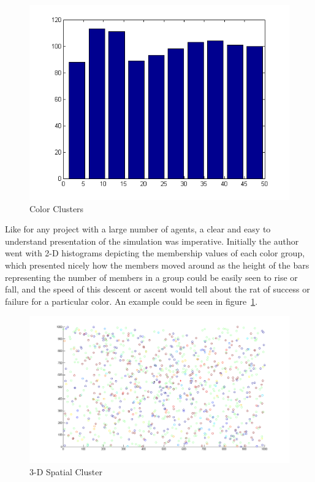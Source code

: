 \begin{figure}
\includegraphics[scale=1]{Figures/1000_agents_color_cluster}
\caption{Color Clusters}
\label{fig:color_clusters}
\end{figure}


Like for any project with a large number of agents, a clear and easy to understand presentation of the simulation was imperative.
Initially the author went with 2-D histograms depicting the membership values of each color group, which presented nicely how the members moved around as the height of the  bars representing the number of members in a group could be easily seen to rise or fall, and the speed of this descent or ascent would tell about the rat of success or failure for a particular color. An example could be seen in figure~\ref{fig:color_clusters}.

\begin{figure}
\includegraphics[scale=0.5]{Figures/spatial}
\caption{3-D Spatial Cluster}
\label{fig:spatial_clusters}
\end{figure}




